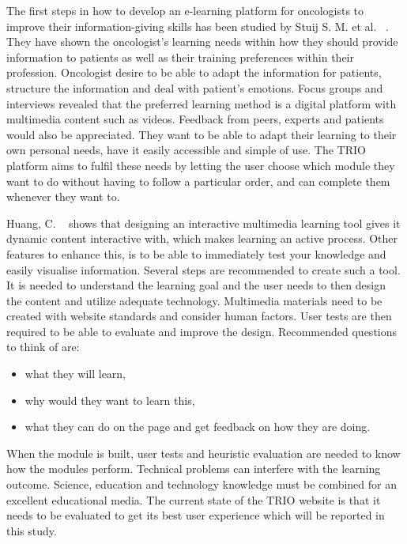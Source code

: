 \documentclass{sigchi}
\begin{document}
The first steps in how to develop an e-learning platform for oncologists to improve their information-giving skills has been studied by Stuij S. M. et al. ~\cite{Stuij2018}. They have shown the oncologist’s learning needs within how they should provide information to patients as well as their training preferences within their profession. Oncologist desire to be able to adapt the information for patients, structure the information and deal with patient’s emotions. Focus groups and interviews revealed that the preferred learning method is a digital platform with multimedia content such as videos. Feedback from peers, experts and patients would also be appreciated. They want to be able to adapt their learning to their own personal needs, have it easily accessible and simple of use. The TRIO platform aims to fulfil these needs by letting the user choose which module they want to do without having to follow a particular order, and can complete them whenever they want to. 

Huang, C. ~\cite{Huang2005} shows that designing an interactive multimedia learning tool gives it dynamic content interactive with, which makes learning an active process. Other features to enhance this, is to be able to immediately test your knowledge and easily visualise information. Several steps are recommended to create such a tool. It is needed to understand the learning goal and the user needs to then design the content and utilize adequate technology. Multimedia materials need to be created with website standards and consider human factors. User tests are then required to be able to evaluate and improve the design. Recommended questions to think of are:

\begin{itemize}
    \item what they will learn, 
    \item why would they want to learn this, 
    \item what they can do on the page and get feedback on how they are doing. 
\end{itemize}

When the module is built, user tests and heuristic evaluation are needed to know how the modules perform. Technical problems can interfere with the learning outcome. Science, education and technology knowledge must be combined for an excellent educational media. The current state of the TRIO website is that it needs to be evaluated to get its best user experience which will be reported in this study. 
\end{document}
